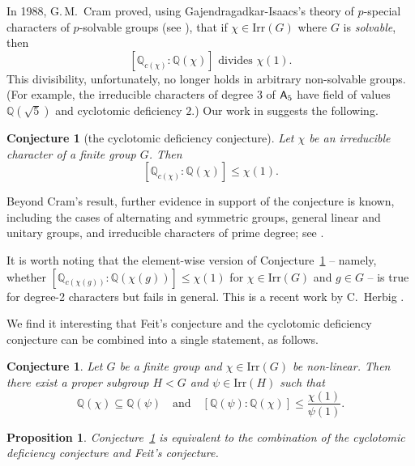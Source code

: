 \documentclass[12pt]{amsart}
\newtheorem{proposition}[theorem]{Proposition}
\newtheorem{conjecture}[theorem]{Conjecture}
\theoremstyle{definition}
\numberwithin{equation}{section}
\newcommand{\Irr}{{\mathrm {Irr}}}
\newcommand{\QQ}{{\mathbb Q}}
\newcommand{\Al}{\textup{\textsf{A}}}
\begin{document}
In 1988, G.\,M.~Cram \cite{Cram88} proved, using
Gajendragadkar-Isaacs's theory of $p$-special characters of
$p$-solvable groups (see \cite[Chapter~2]{I18}), that if
$\chi\in\Irr(G)$ where $G$ is \emph{solvable}, then
$$[\QQ_{c(\chi)}:\QQ(\chi)] \text{ divides } \chi(1).$$ This divisibility,
unfortunately, no longer holds in arbitrary non-solvable groups.
(For example, the irreducible characters of degree 3 of $\Al_5$ have
field of values $\QQ(\sqrt{5})$ and cyclotomic deficiency $2$.) Our
work in \cite{Hung-Tiep23} suggests the following.

\begin{conjecture}[the cyclotomic deficiency conjecture]\label{conj:Hung-Tiep}
Let $\chi$ be an irreducible character of a finite group $G$. Then
\[[\QQ_{c(\chi)}:\QQ(\chi)]\leq \chi(1).\]
\end{conjecture}

\noindent Beyond Cram's result, further evidence in support of the
conjecture is known, including the cases of alternating and
symmetric groups, general linear and unitary groups, and irreducible
characters of prime degree; see \cite{HTZ}.

It is worth noting that the element-wise version of
Conjecture~\ref{conj:Hung-Tiep} -- namely, whether
$[\QQ_{c(\chi(g))}:\QQ(\chi(g))]\leq \chi(1)$ for $\chi\in\Irr(G)$
and $g\in G$ -- is true for degree-2 characters but fails in
general. This is a recent work by C.~Herbig \cite{He25}.

We find it interesting that Feit's conjecture and the cyclotomic
deficiency conjecture can be combined into a single statement, as
follows.

\begin{conjecture}\label{conj:stronger}
Let $G$ be a finite group and $\chi\in\Irr(G)$ be non-linear. Then
there exist a proper subgroup $H<G$ and $\psi\in\Irr(H)$ such that
\[
\QQ(\chi) \subseteq \QQ(\psi) \quad \text{and} \quad [\QQ(\psi) :
\QQ(\chi)] \le \frac{\chi(1)}{\psi(1)}.
\]
\end{conjecture}

\begin{proposition}\label{prop:1}
Conjecture~\ref{conj:stronger} is equivalent to the combination of
the cyclotomic deficiency conjecture and Feit's conjecture.
\end{proposition}
\end{document}
